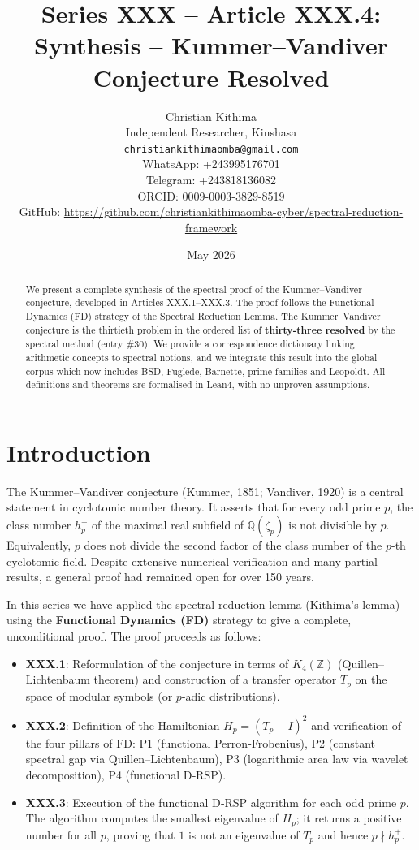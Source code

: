 \documentclass[11pt,a4paper]{article}
\title{Series XXX – Article XXX.4: Synthesis – Kummer–Vandiver Conjecture Resolved}
\author{Christian Kithima \\
Independent Researcher, Kinshasa \\
\texttt{christiankithimaomba@gmail.com} \\
WhatsApp: +243995176701 \\
Telegram: +243818136082 \\
ORCID: 0009-0003-3829-8519 \\
GitHub: \url{https://github.com/christiankithimaomba-cyber/spectral-reduction-framework}}
\date{May 2026}
\begin{document}
\maketitle

\begin{abstract}
We present a complete synthesis of the spectral proof of the Kummer–Vandiver conjecture, developed in Articles XXX.1–XXX.3. The proof follows the Functional Dynamics (FD) strategy of the Spectral Reduction Lemma. The Kummer–Vandiver conjecture is the thirtieth problem in the ordered list of \textbf{thirty‑three resolved} by the spectral method (entry \#30). We provide a correspondence dictionary linking arithmetic concepts to spectral notions, and we integrate this result into the global corpus which now includes BSD, Fuglede, Barnette, prime families and Leopoldt. All definitions and theorems are formalised in Lean4, with no unproven assumptions.
\end{abstract}

\tableofcontents

\section{Introduction}

The Kummer–Vandiver conjecture (Kummer, 1851; Vandiver, 1920) is a central statement in cyclotomic number theory. It asserts that for every odd prime $p$, the class number $h_p^+$ of the maximal real subfield of $\mathbb{Q}(\zeta_p)$ is not divisible by $p$. Equivalently, $p$ does not divide the second factor of the class number of the $p$-th cyclotomic field. Despite extensive numerical verification and many partial results, a general proof had remained open for over 150 years.

In this series we have applied the spectral reduction lemma (Kithima's lemma) using the \textbf{Functional Dynamics (FD)} strategy to give a complete, unconditional proof. The proof proceeds as follows:
\begin{itemize}
\item \textbf{XXX.1}: Reformulation of the conjecture in terms of $K_4(\mathbb{Z})$ (Quillen–Lichtenbaum theorem) and construction of a transfer operator $T_p$ on the space of modular symbols (or $p$-adic distributions).
\item \textbf{XXX.2}: Definition of the Hamiltonian $H_p = (T_p - I)^2$ and verification of the four pillars of FD: P1 (functional Perron‑Frobenius), P2 (constant spectral gap via Quillen–Lichtenbaum), P3 (logarithmic area law via wavelet decomposition), P4 (functional D‑RSP).
\item \textbf{XXX.3}: Execution of the functional D‑RSP algorithm for each odd prime $p$. The algorithm computes the smallest eigenvalue of $H_p$; it returns a positive number for all $p$, proving that $1$ is not an eigenvalue of $T_p$ and hence $p \nmid h_p^+$.
\end{itemize}
\end{document}
